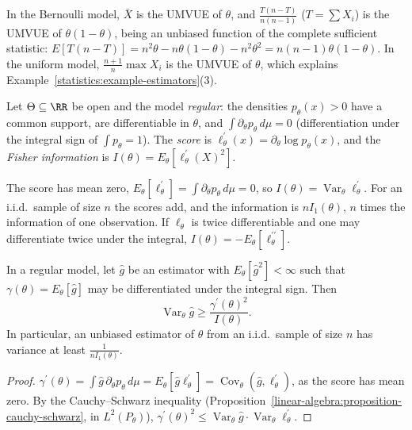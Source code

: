 \begin{example}\label{statistics:example-umvue}
In the Bernoulli model, $\bar X$ is the UMVUE of $\theta$, and $\frac{T(n - T)}{n(n - 1)}$ ($T = \sum X_i$) is the UMVUE of $\theta(1 - \theta)$, being an unbiased function of the complete sufficient statistic: $E[T(n - T)] = n^2\theta - n\theta(1 - \theta) - n^2\theta^2 =
n(n - 1)\theta(1 - \theta)$. In the uniform model, $\frac{n + 1}{n}\max X_i$ is the UMVUE of $\theta$, which explains Example~\ref{statistics:example-estimators}(3).
\end{example}

\begin{definition}\label{statistics:definition-fisher-information}
Let $\Theta \subseteq \RR$ be open and the model \emph{regular}: the densities $p_\theta(x) > 0$ have a common support, are differentiable in $\theta$, and $\int\partial_\theta p_\theta\,d\mu = 0$ (differentiation under the integral sign
of $\int p_\theta = 1$). The \emph{score} is $\ell^{\prime}_\theta(x) = \partial_\theta\log p_\theta(x)$, and the \emph{Fisher information} is $I(\theta) = E_\theta[\ell^{\prime}_\theta(X)^2]$.
\end{definition}

The score has mean zero, $E_\theta[\ell_\theta^{\prime}] = \int\partial_\theta p_\theta\,d\mu = 0$, so $I(\theta) = \operatorname{Var}_\theta\ell^{\prime}_\theta$. For an i.i.d.\ sample of size $n$ the scores add, and the information is $nI_1(\theta)$, $n$ times the
information of one observation. If $\ell_\theta$ is twice differentiable and one may differentiate twice under the integral, $I(\theta) = -E_\theta[\ell^{\prime\prime}_\theta]$.

\begin{theorem}\label{statistics:theorem-cramer-rao}
In a regular model, let $\hat g$ be an estimator with $E_\theta[\hat g^2] < \infty$ such that $\gamma(\theta) = E_\theta[\hat g]$ may be differentiated under the integral sign. Then
\[
\operatorname{Var}_\theta\hat g \geq \frac{\gamma^{\prime}(\theta)^2}{I(\theta)}.
\]
In particular, an unbiased estimator of $\theta$ from an i.i.d.\ sample of size $n$ has variance at least $\frac{1}{nI_1(\theta)}$.
\end{theorem}

\begin{proof}
$\gamma^{\prime}(\theta) = \int\hat g\,\partial_\theta p_\theta\,d\mu = E_\theta[\hat g\ell_\theta^{\prime}] = \operatorname{Cov}_\theta(\hat g, \ell^{\prime}_\theta)$, as the score has mean zero. By the Cauchy--Schwarz inequality
(Proposition~\ref{linear-algebra:proposition-cauchy-schwarz}, in $L^2(P_\theta)$), $\gamma^{\prime}(\theta)^2 \leq \operatorname{Var}_\theta\hat g\cdot\operatorname{Var}_\theta\ell^{\prime}_\theta$.
\end{proof}

